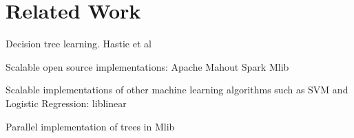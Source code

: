 \section{Related Work}
\label{sec:related}

Decision tree learning.
Hastie et al\cite{hastie:book2008} 

Scalable open source implementations: Apache Mahout Spark Mlib

Scalable implementations of other machine learning algorithms such as SVM and Logistic Regression: liblinear

Parallel implementation of trees in Mlib \cite{das:blog2014}
